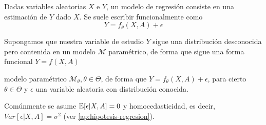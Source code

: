 \begin{definicion}
    Dadas variables aleatorias $X$ e $Y$, un modelo de regresión consiste en una estimación de $Y$
    dado $X$. Se suele escribir funcionalmente como
    \[
        Y = f_\theta(X, A) + \epsilon
    \]

    Supongamos que nuestra variable de estudio $Y$ sigue una distribución desconocida pero contenida en
    un modelo $\mathcal{M}$ paramétrico, de forma que sigue una forma funcional $Y = f(X, A)$

    modelo paramétrico $\mathcal{M}_\theta, \theta \in \Theta$, de forma que
    $Y = f_\theta(X, A) + \epsilon$,
    para cierto $\theta \in \Theta$ y $\epsilon$ una variable aleatoria con distribución conocida.


    Comúnmente se asume $\mathbb{E}[\epsilon | X, A] = 0$ y homocedasticidad, es decir, $Var[\epsilon | X, A] = \sigma^2$ (ver \autoref{ap:hipotesis-regresion}).
\end{definicion}
